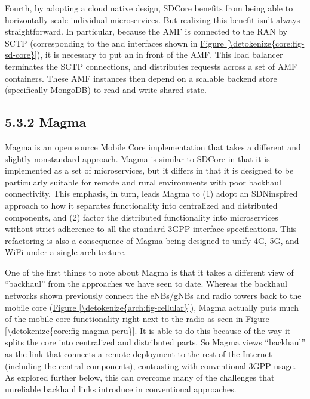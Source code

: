 \documentclass[a4paper,11pt,english]{sphinxmanual}
\begin{document}
\sphinxAtStartPar
Fourth, by adopting a cloud native design, SD\sphinxhyphen{}Core benefits from being
able to horizontally scale individual microservices. But realizing
this benefit isn’t always straightforward. In particular, because the
AMF is connected to the RAN by SCTP (corresponding to the  and
 interfaces shown in \hyperref[\detokenize{core:fig-sd-core}]{Figure \ref{\detokenize{core:fig-sd-core}}}), it is
necessary to put an  in front of the AMF. This
load balancer terminates the SCTP connections, and distributes
requests across a set of AMF containers. These AMF instances then
depend on a scalable backend store (specifically MongoDB) to read and
write shared state.


\subsection{5.3.2 Magma}
\label{\detokenize{core:magma}}
\sphinxAtStartPar
Magma is an open source Mobile Core implementation that takes a
different and slightly non\sphinxhyphen{}standard approach. Magma is similar to
SD\sphinxhyphen{}Core in that it is implemented as a set of microservices, but it
differs in that it is designed to be particularly suitable for remote
and rural environments with poor backhaul connectivity. This
emphasis, in turn, leads Magma to (1) adopt an SDN\sphinxhyphen{}inspired approach
to how it separates functionality into centralized and distributed
components, and (2) factor the distributed functionality into
microservices without strict adherence to all the standard 3GPP interface
specifications. This refactoring is also a consequence of Magma being
designed to unify 4G, 5G, and WiFi under a single architecture.

\sphinxAtStartPar
One of the first things to note about Magma is that it takes a
different view of “backhaul” from the approaches we have seen to
date. Whereas the backhaul networks shown previously connect the
eNBs/gNBs and radio towers back to the mobile core (\hyperref[\detokenize{arch:fig-cellular}]{Figure \ref{\detokenize{arch:fig-cellular}}}), Magma actually puts much of the mobile core
functionality right next to the radio as seen in \hyperref[\detokenize{core:fig-magma-peru}]{Figure \ref{\detokenize{core:fig-magma-peru}}}.  It is able to do this because of the way it splits
the core into centralized and distributed parts. So Magma views
“backhaul” as the link that connects a remote deployment to the rest
of the Internet (including the central components), contrasting with
conventional 3GPP usage. As explored further below, this can overcome
many of the challenges that unreliable backhaul links introduce in
conventional approaches.
\end{document}
